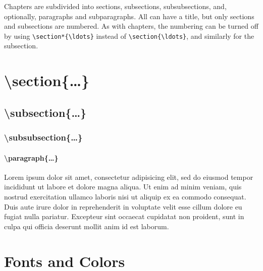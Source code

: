 Chapters are subdivided into sections, subsections, subsubsections, and, optionally, paragraphs and subparagraphs. All can have a title, but only sections and subsections are numbered. As with chapters, the numbering can be turned off by using \verb|\section*{\ldots}| instead of \verb|\section{\ldots}|, and similarly for the subsection.
\section{\textbackslash section\{\ldots\}}
\subsection{\textbackslash subsection\{\ldots\}}
\subsubsection{\textbackslash subsubsection\{\ldots\}}
\paragraph{\textbackslash paragraph\{\ldots\}}
Lorem ipsum dolor sit amet, consectetur adipisicing elit, sed do eiusmod tempor incididunt ut labore et dolore magna aliqua. Ut enim ad minim veniam, quis nostrud exercitation ullamco laboris nisi ut aliquip ex ea commodo consequat. Duis aute irure dolor in reprehenderit in voluptate velit esse cillum dolore eu fugiat nulla pariatur. Excepteur sint occaecat cupidatat non proident, sunt in culpa qui officia deserunt mollit anim id est laborum.

\section{Fonts and Colors}

